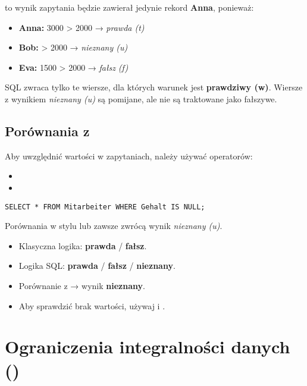 to wynik zapytania będzie zawierał jedynie rekord \textbf{Anna}, ponieważ:
\begin{itemize}
    \item \textbf{Anna:} 3000 > 2000 → \textit{prawda (t)}
    \item \textbf{Bob:}  > 2000 → \textit{nieznany (u)}
    \item \textbf{Eva:} 1500 > 2000 → \textit{fałsz (f)}
\end{itemize}

SQL zwraca tylko te wiersze, dla których warunek jest \textbf{prawdziwy (w)}.  
Wiersze z wynikiem \textit{nieznany (u)} są pomijane, ale nie są traktowane jako fałszywe.

\subsection{Porównania z }

Aby uwzględnić wartości  w zapytaniach, należy używać operatorów:
\begin{itemize}
    \item {}
    \item {}
\end{itemize}

\begin{lstlisting}[style=sqlstyle]
SELECT * FROM Mitarbeiter WHERE Gehalt IS NULL;
\end{lstlisting}

Porównania w stylu  lub  zawsze zwrócą wynik \textit{nieznany (u)}.

\begin{itemize}
    \item Klasyczna logika: \textbf{prawda} / \textbf{fałsz}.
    \item Logika SQL: \textbf{prawda} / \textbf{fałsz} / \textbf{nieznany}.
    \item Porównanie z  → wynik \textbf{nieznany}.
    \item Aby sprawdzić brak wartości, używaj  i .
\end{itemize}

\section{Ograniczenia integralności danych ()\label{sql:constraints}}

